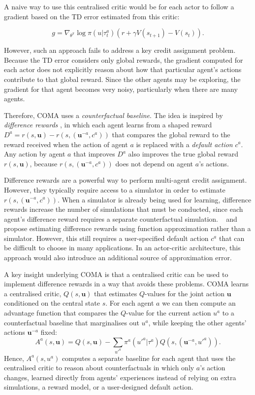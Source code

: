 \documentclass[letterpaper]{article}
\newcommand{\citet}[1]{\citeauthor{#1}~\shortcite{#1}}
\newcommand{\citep}{\cite}
\newcommand{\myvec}[1]{\mathbf{#1}}
\newcommand{\vu}{\myvec{u}}
\begin{document}
A naive way to use this centralised critic would be for each actor to follow a 
gradient based on the TD error estimated from this critic:

\begin{equation}
g = \nabla_{\theta^{\pi}}  \log  \pi({u|\tau^a_t} )\left( r + \gamma V(s_{t+1}) - V(s_t) \right).
\end{equation}

 However, such an approach fails to address a key credit assignment problem.  
 Because the TD error considers only global rewards, the gradient computed for 
 each actor does not explicitly reason about how that particular agent's 
 actions contribute to that global reward.  Since the other agents may be 
 exploring, the gradient for that agent becomes very noisy, particularly when 
 there are many agents.

Therefore, COMA uses a \emph{counterfactual baseline}.  The idea is inspired by 
\emph{difference rewards} \citep{wolpert2002optimal}, in which each agent 
learns from a shaped reward $D^a = r(s,\vu) - r(s, (\vu^{-a},c^a))$ that 
compares the global reward to the reward received when the action of agent $a$ 
is replaced with a \emph{default action} $c^a$. Any action by agent $a$ that 
improves $D^a$ also improves the true global reward $r(s, \vu)$, because $r(s, 
(\vu^{-a},c^a))$ does not depend on agent $a$'s actions.

Difference rewards are a powerful way to perform multi-agent credit 
assignment.  However, they typically require access to a simulator in order to 
estimate $r(s, (\vu^{-a},c^a))$.  When a simulator is already being used for 
learning, difference rewards increase the number of simulations that must be 
conducted, since each agent's difference reward requires a separate 
counterfactual simulation. \citet{proper2012modeling} and 
\citet{colby2015approximating} 
propose estimating difference rewards using function approximation rather than a 
simulator. However, this still requires a 
user-specified default action $c^a$ that can be difficult to choose in many 
applications. In an actor-critic architecture, this approach would also
introduce an additional source of approximation error.

A key insight underlying COMA is that a centralised critic can be used to 
implement difference rewards in a way that avoids these problems.  COMA learns 
a centralised critic, $Q(s, \vu)$ that estimates $Q$-values for the joint 
action $\vu$ conditioned on the central state $s$. For each agent $a$ we can 
then compute an advantage function that compares the $Q$-value for the current 
action $u^a$ to a counterfactual baseline that marginalises out $u^a$, while 
keeping the other agents' actions $\vu^{-a}$ fixed:
\begin{equation}
	\label{eqn:advantage}
	A^a(s, \vu) = Q(s, \vu ) - \sum_{u'^a} \pi^a(u'^a \vert \tau^a) 
	Q(s,(\vu^{-a},u'^a)).
\end{equation}
Hence, $A^a(s, u^a)$ computes a separate baseline for each agent that uses the 
centralised critic to reason about counterfactuals in which only $a$'s action 
changes, learned directly from agents' experiences instead of relying on extra 
simulations, a reward model, or a user-designed default action.
\end{document}
